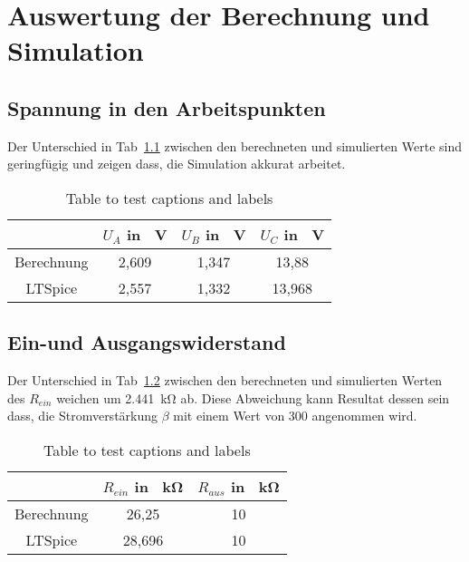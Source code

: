 \chapter{Auswertung der Berechnung und Simulation}
    \section{Spannung in den Arbeitspunkten}
        Der Unterschied in Tab~\ref{tab:arbeit} zwischen den berechneten und simulierten Werte sind geringfügig und zeigen dass, die Simulation akkurat arbeitet. 
        \begin{table}[h!]
            \centering
            \caption{Table to test captions and labels}
            \begin{tabular}{| c | c | c | c |} 
                \hline
                & \(U_A\) in \SI{}{\V} & \(U_B\) in \SI{}{\V}  & \(U_C\) in \SI{}{\V}  \\
                \hline
                Berechnung & 2,609 & 1,347 & 13,88 \\ 
                \hline
                LTSpice & 2,557 & 1,332 & 13,968 \\
                \hline
            \end{tabular}
            \label{tab:arbeit}
        \end{table}
    \section{Ein-und Ausgangswiderstand}
        Der Unterschied in Tab~\ref{tab:widerstand} zwischen den berechneten und simulierten Werten des \(R_{ein}\) weichen um \SI{2.441}{\kilo\ohm} ab. Diese Abweichung kann Resultat dessen sein dass, die Stromverstärkung \(\beta\) mit einem Wert von 300 angenommen wird.
                \begin{table}[h!]
            \centering
            \caption{Table to test captions and labels}
            \begin{tabular}{| c | c | c |} 
                \hline
                & \(R_{ein}\) in \SI{}{\kilo\ohm} & \(R_{aus}\) in \SI{}{\kilo\ohm}    \\
                \hline
                Berechnung & 26,25 & 10 \\ 
                \hline
                LTSpice & 28,696 & 10  \\
                \hline
            \end{tabular}
            \label{tab:widerstand}
        \end{table}
